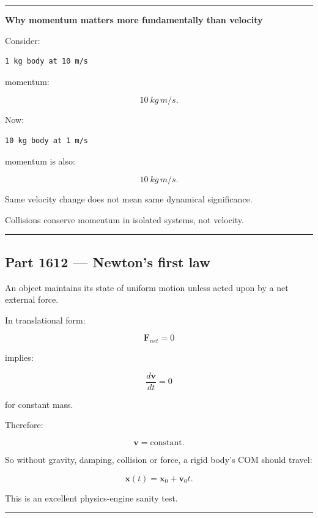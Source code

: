 \begin{center}\rule{0.5\linewidth}{0.5pt}\end{center}

\textbf{Why momentum matters more fundamentally than velocity}

Consider:

\begin{verbatim}
1 kg body at 10 m/s
\end{verbatim}

momentum:

\[
10\ kg\,m/s.
\]

Now:

\begin{verbatim}
10 kg body at 1 m/s
\end{verbatim}

momentum is also:

\[
10\ kg\,m/s.
\]

Same velocity change does not mean same dynamical significance.

Collisions conserve momentum in isolated systems, not velocity.

\begin{center}\rule{0.5\linewidth}{0.5pt}\end{center}

\subsection{Part 1612 --- Newton's first law}\label{06-engine-ii-ch034-part-1612-newtons-first-law}

An object maintains its state of uniform motion unless acted upon by a net external force.

In translational form:

\[
\mathbf{F}_{net}=0
\]

implies:

\[
\frac{d\mathbf{v}}{dt}=0
\]

for constant mass.

Therefore:

\[
\mathbf{v}=\text{constant}.
\]

So without gravity, damping, collision or force, a rigid body's COM should travel:

\[
\mathbf{x}(t)
=
\mathbf{x}_0
+
\mathbf{v}_0t.
\]

This is an excellent physics-engine sanity test.

\begin{center}\rule{0.5\linewidth}{0.5pt}\end{center}

